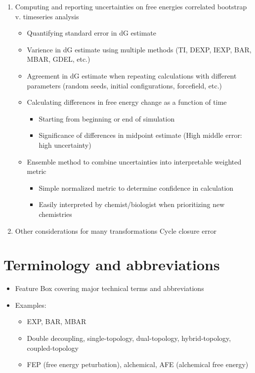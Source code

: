 \documentclass[9pt,bestpractices]{livecoms}
\begin{document}
\begin{enumerate}
\item Computing and reporting uncertainties on free energies
correlated bootstrap v. timeseries analysis
\begin{itemize}
\item Quantifying standard error in dG estimate
\item Varience in dG estimate using multiple methods (TI, DEXP, IEXP, BAR, MBAR, GDEL, etc.)
\item Agreement in dG estimate when repeating calculations with different parameters (random seeds, initial configurations, forcefield, etc.)
\item Calculating differences in free energy change as a function of time
\begin{itemize}
	\item Starting from beginning or end of simulation
	\item Significance of differences in midpoint estimate (High middle error: high uncertainty)
\end{itemize}
\item Ensemble method to combine uncertainties into interpretable weighted metric
\begin{itemize}
	\item Simple normalized metric to determine confidence in calculation
	\item Easily interpreted by chemist/biologist when prioritizing new chemistries
\end{itemize}
\end{itemize}
\item Other considerations for many transformations
Cycle closure error



\end{enumerate}

\section{Terminology and abbreviations}
\label{sec:tem-abbrev}
\begin{itemize}
\item Feature Box covering major technical terms and abbreviations
\item Examples:
\begin{itemize}
\item EXP, BAR, MBAR
\item Double decoupling, single-topology, dual-topology, hybrid-topology, coupled-topology
\item FEP (free energy peturbation), alchemical, AFE (alchemical free energy)
\end{itemize}
\end{itemize}
\end{document}
